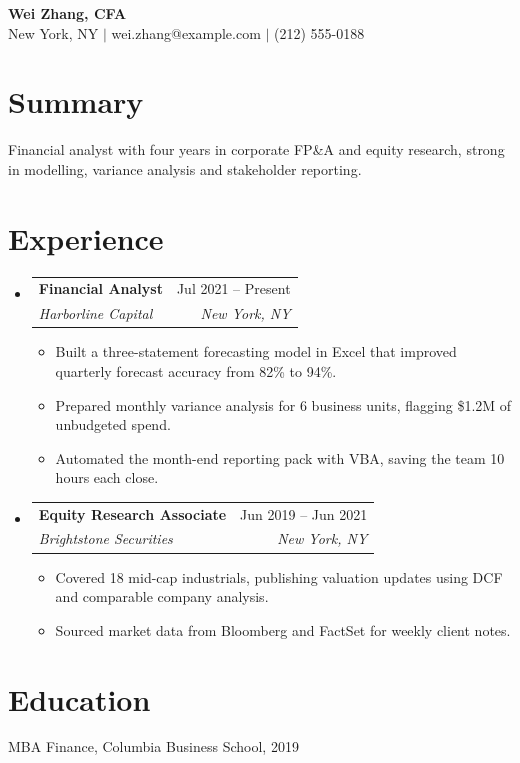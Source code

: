 \documentclass[letterpaper,11pt]{article}
\makeatletter
\newcommand{\resumeItem}[1]{\item\small{#1}}
\newcommand{\resumeSubheading}[4]{\vspace{-1pt}\item
  \begin{tabular*}{0.97\textwidth}[t]{l@{\extracolsep{\fill}}r}
    \textbf{#1} & #2 \\ \textit{\small#3} & \textit{\small #4} \\
  \end{tabular*}\vspace{-5pt}}
\newcommand{\resumeSubHeadingListStart}{\begin{itemize}[leftmargin=0.15in, label={}]}
\newcommand{\resumeSubHeadingListEnd}{\end{itemize}}
\newcommand{\resumeItemListStart}{\begin{itemize}}
\newcommand{\resumeItemListEnd}{\end{itemize}\vspace{-5pt}}
\makeatother
\begin{document}
\begin{center}
{\Large \textbf{Wei Zhang, CFA}} \\
New York, NY $|$ wei.zhang@example.com $|$ (212) 555-0188
\end{center}
\section*{Summary}
Financial analyst with four years in corporate FP\&A and equity research, strong in modelling, variance analysis and stakeholder reporting.
\section*{Experience}
\resumeSubHeadingListStart
\resumeSubheading{Financial Analyst}{Jul 2021 -- Present}{Harborline Capital}{New York, NY}
\resumeItemListStart
\resumeItem{Built a three-statement forecasting model in Excel that improved quarterly forecast accuracy from 82\% to 94\%.}
\resumeItem{Prepared monthly variance analysis for 6 business units, flagging \$1.2M of unbudgeted spend.}
\resumeItem{Automated the month-end reporting pack with VBA, saving the team 10 hours each close.}
\resumeItemListEnd
\resumeSubheading{Equity Research Associate}{Jun 2019 -- Jun 2021}{Brightstone Securities}{New York, NY}
\resumeItemListStart
\resumeItem{Covered 18 mid-cap industrials, publishing valuation updates using DCF and comparable company analysis.}
\resumeItem{Sourced market data from Bloomberg and FactSet for weekly client notes.}
\resumeItemListEnd
\resumeSubHeadingListEnd
\section*{Education}
MBA Finance, Columbia Business School, 2019
\end{document}
